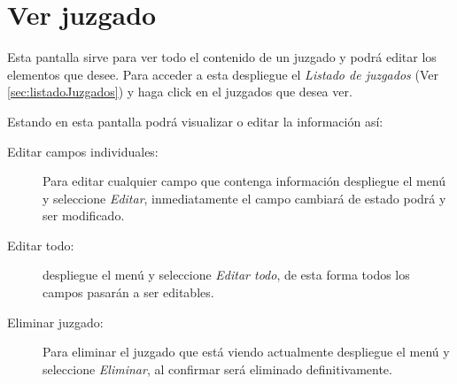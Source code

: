 \section{Ver juzgado}
\label{sec:verJuzgado}
Esta pantalla sirve para ver todo el contenido de un juzgado y
podr\'a editar los elementos que desee. Para acceder a esta
despliegue el \emph{Listado de juzgados}
(Ver \ref{sec:listadoJuzgados}) y haga click en el juzgados que
desea ver.

Estando en esta pantalla podr\'a visualizar o editar la informaci\'on as\'i:

\begin{description}
\item[Editar campos individuales:]Para editar cualquier campo que contenga
informaci\'on despliegue el men\'u \blackberry y seleccione \emph{Editar},
inmediatamente el campo
cambiar\'a de estado podr\'a y ser modificado.
\item[Editar todo:]despliegue el men\'u \blackberry y seleccione \emph{Editar todo},
de esta forma todos los campos pasar\'an a ser editables.
\item[Eliminar juzgado:]Para eliminar el juzgado que
est\'a viendo actualmente despliegue el men\'u \blackberry y
seleccione \emph{Eliminar}, al confirmar ser\'a eliminado definitivamente.
\end{description}

\guardarVer